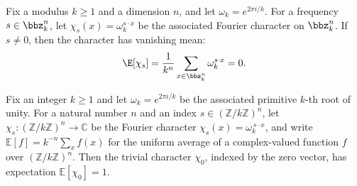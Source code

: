 \begin{lemma}
\label{ZkFourier.expectation_char_nontrivial}
\leanok
{}
Fix a modulus $k \ge 1$ and a dimension $n$, and let $\omega_k = e^{2\pi i/k}$. For a
frequency $s \in \bbz_k^n$, let $\chi_s(x) = \omega_k^{s\cdot x}$ be the associated
Fourier character on $\bbz_k^n$. If $s \neq 0$, then the character has vanishing mean:
\[
  \E[\chi_s] = \frac{1}{k^n}\sum_{x \in \bbz_k^n} \omega_k^{s\cdot x} = 0.
\]
\end{lemma}

\begin{lemma}
\label{ZkFourier.expectation_char_trivial}
\leanok
{}
Fix an integer $k \ge 1$ and let $\omega_k = e^{2\pi i/k}$ be the associated primitive
$k$-th root of unity. For a natural number $n$ and an index $s \in
(\mathbb{Z}/k\mathbb{Z})^n$, let $\chi_s \colon (\mathbb{Z}/k\mathbb{Z})^n \to
\mathbb{C}$ be the Fourier character $\chi_s(x) = \omega_k^{\,s \cdot x}$, and write
$\mathbb{E}[f] = k^{-n}\sum_{x} f(x)$ for the uniform average of a complex-valued
function $f$ over $(\mathbb{Z}/k\mathbb{Z})^n$. Then the trivial character $\chi_0$,
indexed by the zero vector, has expectation $\mathbb{E}[\chi_0] = 1$.
\end{lemma}

